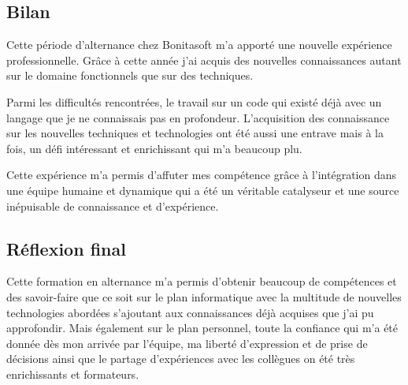 \subsection{Bilan}
Cette période d'alternance chez Bonitasoft m'a apporté une nouvelle expérience professionnelle. Grâce à cette année j'ai acquis des nouvelles connaissances autant sur le domaine fonctionnels que sur des techniques.

Parmi les difficultés rencontrées, le travail sur un code qui existé déjà avec un langage que je ne connaissais pas en profondeur. L'acquisition des connaissance sur les nouvelles techniques et  technologies ont été aussi une entrave mais à la fois, un défi intéressant et enrichissant qui m'a beaucoup plu.

Cette expérience m'a permis d'affuter mes compétence grâce à l'intégration dans une équipe humaine et dynamique qui a été un véritable catalyseur et une source inépuisable de connaissance et d'expérience.


\subsection{Réflexion final}
Cette formation en alternance m'a permis d'obtenir beaucoup de compétences et des savoir-faire que ce soit sur le plan informatique avec la multitude de nouvelles technologies abordées s'ajoutant aux connaissances déjà acquises que j'ai pu approfondir. Mais également sur le plan personnel, toute la confiance qui m'a été donnée dès mon arrivée par l'équipe, ma liberté d'expression et de prise de décisions ainsi que le partage d'expériences avec les collègues on été très enrichissants et formateurs.
